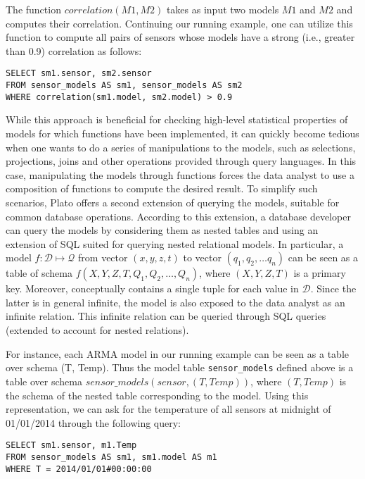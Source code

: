 \vspace*{0.5cm}
\begin{example}
The function $correlation(M1, M2)$ takes as input two models $M1$ and $M2$ and computes their correlation. Continuing our running example, one can utilize this function to compute all pairs of sensors whose models have a strong (i.e., greater than 0.9) correlation as follows:
\begin{verbatim}
SELECT sm1.sensor, sm2.sensor
FROM sensor_models AS sm1, sensor_models AS sm2
WHERE correlation(sm1.model, sm2.model) > 0.9 
\end{verbatim}
\end{example}
\vspace*{0.5cm}

 While this approach is beneficial for checking high-level statistical properties of models for which functions have been implemented, it can quickly become tedious when one wants to do a series of manipulations to the models, such as selections, projections, joins and other operations provided through query languages. In this case, manipulating the models through functions forces the data analyst to use a composition of functions to compute the desired result.  To simplify such scenarios, Plato offers a second extension of querying the models, suitable for common database operations. According to this extension, a database developer can query the models by considering them as nested tables and using an extension of SQL suited for querying nested relational models. In particular, a model $f: \mathcal{D} \mapsto \mathcal{Q}$ from vector $(x, y, z, t)$ to vector $(q_1, q_2, \ldots q_n)$ can be seen as a table of schema $f(X, Y, Z, T, Q_1, Q_2, \ldots, Q_n)$, where $(X, Y, Z, T)$ is a primary key. Moreover, conceptually contains a single tuple for each value in $\mathcal{D}$.  Since the latter is in general infinite, the model is also exposed to the data analyst as an infinite relation. This infinite relation can be queried through SQL queries (extended to account for nested relations).

\vspace*{0.5cm}
\begin{example}
For instance, each ARMA model in our running example can be seen as a table over schema (T, Temp). Thus the model table \texttt{sensor\_models} defined above is a table over schema $sensor\_models(sensor, (T, Temp))$, where $(T, Temp)$ is the schema of the nested table corresponding to the model. Using this representation, we can ask for the temperature of all sensors at midnight of 01/01/2014 through the following query:

\begin{verbatim}
SELECT sm1.sensor, m1.Temp
FROM sensor_models AS sm1, sm1.model AS m1
WHERE T = 2014/01/01#00:00:00
\end{verbatim}
\end{example}
\vspace*{0.5cm}

